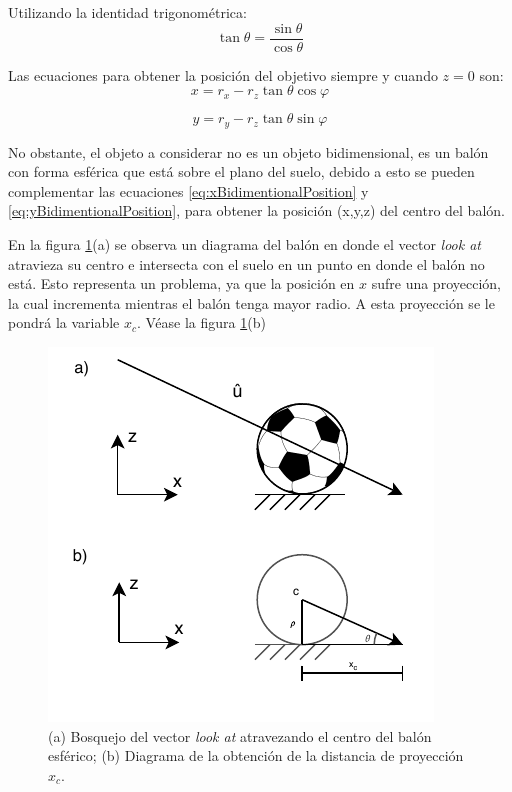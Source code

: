 Utilizando la identidad trigonométrica:
\[\tan{\theta} = \frac{\sin{\theta}}{\cos{\theta}}\]

Las ecuaciones para obtener la posición del objetivo siempre y cuando $z=0$ son:
\begin{equation}
\label{eq:xBidimentionalPosition}
x=r_x - r_z \tan{\theta}  \cos{\varphi}
\end{equation}

\begin{equation}
\label{eq:yBidimentionalPosition}
y=r_y - r_z \tan{\theta} \sin{\varphi}
\end{equation}

No obstante, el objeto a considerar no es un objeto bidimensional, es un balón con forma esférica que está sobre el plano del suelo, debido a esto se pueden complementar las ecuaciones \ref{eq:xBidimentionalPosition} y \ref{eq:yBidimentionalPosition}, para obtener la posición (x,y,z) del centro del balón.

En la figura \ref{fig:ballProjection}(a) se observa un diagrama del balón en donde el vector \textit{look at} atravieza su centro e intersecta con el suelo en un punto en donde el balón no está. Esto representa un problema, ya que la posición en $x$ sufre una proyección, la cual incrementa mientras el balón tenga mayor radio. A esta proyección se le pondrá la variable $x_c$. Véase la figura \ref{fig:ballProjection}(b)


\begin{figure}
	\centering
	\includegraphics[scale=1.4]{images/ball_projection.pdf}
	\caption{(a) Bosquejo del vector \textit{look at} atravezando el centro del balón esférico; (b) Diagrama de la obtención de la distancia de proyección $x_c$.}
	\label{fig:ballProjection}
\end{figure}


